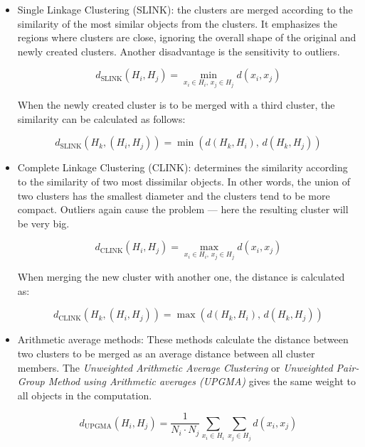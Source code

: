 \documentclass[11pt,openany,executivepaper]{book}
\begin{document}
\begin{itemize}
    \item Single Linkage Clustering (SLINK): the clusters are merged according to the similarity of the most similar objects from the clusters. It emphasizes the regions where clusters are close, ignoring the overall shape of the original and newly created clusters. Another disadvantage is the sensitivity to outliers.

    \begin{equation}
        d_{\text{SLINK}}(H_i, H_j) = \min_{x_i \in H_i,\, x_j \in H_j} d(x_i, x_j)
    \end{equation}

    When the newly created cluster is to be merged with a third cluster, the similarity can be calculated as follows:

    \begin{equation}
        d_{\text{SLINK}}(H_k, (H_i, H_j)) = \min(d(H_k, H_i),\, d(H_k, H_j))
    \end{equation}

    \item Complete Linkage Clustering (CLINK): determines the similarity according to the similarity of two most dissimilar objects. In other words, the union of two clusters has the smallest diameter and the clusters tend to be more compact. Outliers again cause the problem — here the resulting cluster will be very big.

    \begin{equation}
        d_{\text{CLINK}}(H_i, H_j) = \max_{x_i \in H_i,\, x_j \in H_j} d(x_i, x_j)
    \end{equation}

    When merging the new cluster with another one, the distance is calculated as:

    \begin{equation}
        d_{\text{CLINK}}(H_k, (H_i, H_j)) = \max(d(H_k, H_i),\, d(H_k, H_j))
    \end{equation}

        \item Arithmetic average methods: These methods calculate the distance between two clusters to be merged as an average distance between all cluster members. The \textit{Unweighted Arithmetic Average Clustering} or \textit{Unweighted Pair-Group Method using Arithmetic averages (UPGMA)} gives the same weight to all objects in the computation.

    \begin{equation}
        d_{\text{UPGMA}}(H_i, H_j) =
        \frac{1}{N_i \cdot N_j}
        \sum_{x_i \in H_i} \sum_{x_j \in H_j} d(x_i, x_j)
    \end{equation}


\end{itemize}
\end{document}
